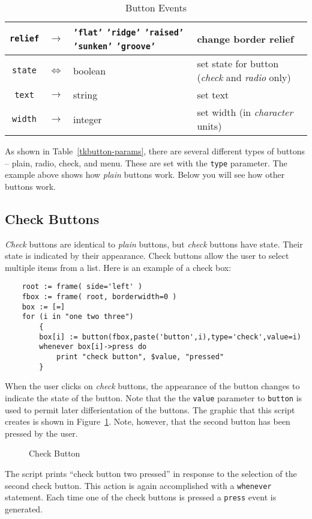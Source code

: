 \begin{table}[tbh]
{\begin{center}
\begin{tabular}{|c|c|p{1.6in}|p{2.5in}|}
{\tt relief}    &$\rightarrow$& {\tt 'flat'} {\tt 'ridge'} {\tt 'raised'} {\tt 'sunken'} {\tt 'groove'} & change border relief \\ \hline
{\tt state}     &$\Leftrightarrow$& boolean & set state for button ({\em check} and {\em radio} only) \\ \hline
{\tt text}      &$\rightarrow$& string & set text \\ \hline
{\tt width}     &$\rightarrow$& integer & set width (in {\em character} units) \\ \hline
\end{tabular}
\end{center}
}
\caption{ Button Events }
\label{tkbutton-events}
\end{table}

As shown in Table~\ref{tkbutton-params}, there are several different types
of buttons -- plain, radio, check, and menu. These are set with the {\tt type}
parameter. The example above shows how {\em plain} buttons
work. Below you
will see how other buttons work.

\subsection{Check Buttons}
{\em Check} buttons are identical to {\em plain}
buttons, but {\em check} buttons have state. Their state is indicated
by their appearance. Check buttons allow the user to select multiple
items from a list. Here is an example of a check box:
\begin{verbatim}
    root := frame( side='left' )
    fbox := frame( root, borderwidth=0 )
    box := [=]
    for (i in "one two three")
        {
        box[i] := button(fbox,paste('button',i),type='check',value=i)
        whenever box[i]->press do
            print "check button", $value, "pressed"
        }
\end{verbatim}
When the user clicks on {\em check} buttons, the appearance of the button
changes to indicate the state of the button. Note that the the {\tt value}
parameter to {\tt button} is used to permit later differientation of
the buttons. The graphic that this script creates is shown in 
Figure~\ref{tkcheckb}. Note, however, that the second button has been
pressed by the user.
\begin{figure}[thb]
\centerline{}
\caption{ Check Button }
\label{tkcheckb}
\end{figure}
The script prints ``check button two pressed'' in response to the selection
of the second check button. This action is again accomplished with a
{\tt whenever} statement. Each time one of the check buttons is pressed
a {\tt press} event is generated.

